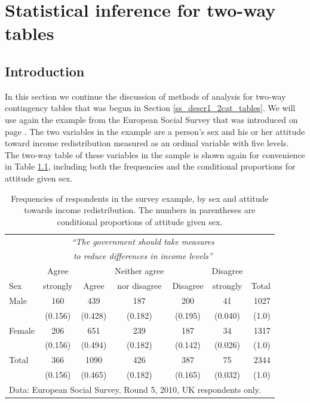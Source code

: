 \chapter{Statistical
inference for two-way tables}
\label{c_tables}

\section{Introduction}
\label{s_tables_intro}

In this section we continue the discussion of methods of analysis for
two-way contingency tables that was begun in Section
\ref{ss_descr1_2cat_tables}. We will use again the example from the
European Social Survey that was introduced on page
\pageref{p_ess_example}. The two variables in the example are a person's
sex and his or her attitude toward income redistribution measured as an
ordinal variable with five levels. The two-way table of
these variables in the sample is shown again for convenience in Table
\ref{t_sex_attitude_ch4}, including both the frequencies and the conditional
proportions for attitude given sex.

\begin{table}
\caption{Frequencies of respondents in the survey example,
by sex and attitude towards income redistribution. The numbers in
parentheses are conditional proportions
of attitude given sex.}
\label{t_sex_attitude_ch4}
\begin{center}
\begin{tabular}{|l|ccccc|r|}\hline
& \multicolumn{5}{|c|}{\emph{``The government should
take measures}} & \\
& \multicolumn{5}{|c|}{\emph{to reduce differences in income levels''}}
& \\
 & Agree & & Neither agree & & Disagree & \\
Sex & strongly & Agree & nor disagree & Disagree & strongly & Total \\ \hline
Male &  160& 439 & 187 &200  & 41 & 1027 \\
& (0.156) & (0.428) & (0.182) & (0.195) & (0.040) & (1.0) \\
Female & 206 & 651 & 239 & 187 & 34 & 1317\\
& (0.156) & (0.494) & (0.182) & (0.142) & (0.026) & (1.0) \\
\hline
Total & 366 & 1090 & 426 & 387 & 75 & 2344 \\
 & (0.156) & (0.465) & (0.182) & (0.165)& (0.032) & (1.0) \\
\hline
\multicolumn{7}{l}{\scriptsize Data: European Social Survey, Round 5,
2010, UK respondents only.}
\end{tabular}
\end{center}

\end{table}

